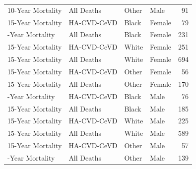 \documentclass[
]{article}
\begin{document}
\begin{table}
\begin{tabular}[t]{llllr}
10-Year Mortality & All Deaths & Other & Male & 91\\
15-Year Mortality & HA-CVD-CeVD & Black & Female & 79\\
\addlinespace
15-Year Mortality & All Deaths & Black & Female & 231\\
15-Year Mortality & HA-CVD-CeVD & White & Female & 251\\
15-Year Mortality & All Deaths & White & Female & 694\\
15-Year Mortality & HA-CVD-CeVD & Other & Female & 56\\
15-Year Mortality & All Deaths & Other & Female & 170\\
\addlinespace
15-Year Mortality & HA-CVD-CeVD & Black & Male & 76\\
15-Year Mortality & All Deaths & Black & Male & 185\\
15-Year Mortality & HA-CVD-CeVD & White & Male & 225\\
15-Year Mortality & All Deaths & White & Male & 589\\
15-Year Mortality & HA-CVD-CeVD & Other & Male & 57\\
\addlinespace
15-Year Mortality & All Deaths & Other & Male & 139\\
\bottomrule
\end{tabular}
\end{table}
\end{document}
